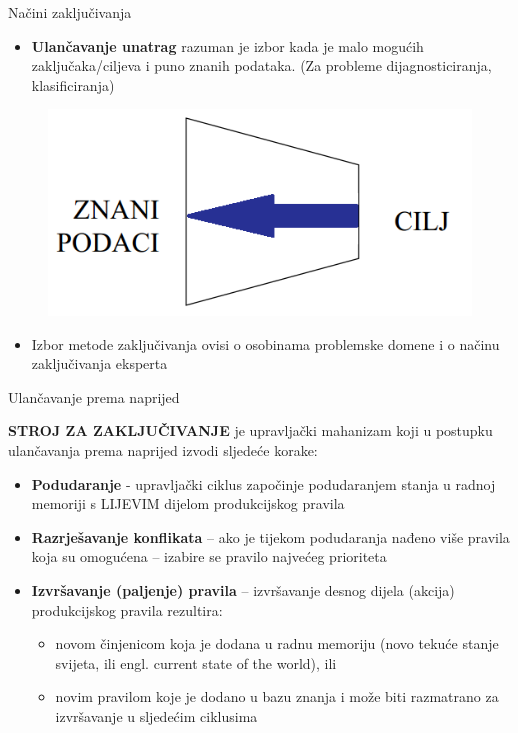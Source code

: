 \documentclass[xcolor=dvipsnames]{beamer}
\begin{document}
\begin{frame}{Načini zaključivanja}

\begin{itemize}
\item \textbf{Ulančavanje unatrag} razuman je izbor kada je malo mogućih zaključaka/ciljeva i puno znanih podataka. (Za probleme dijagnosticiranja, klasificiranja)
\end{itemize}


\begin{figure}
\center
\includegraphics[scale=0.5]{img/natrag.png}
\end{figure}


\begin{itemize}
\item Izbor metode zaključivanja ovisi o osobinama problemske domene i o načinu zaključivanja eksperta
\end{itemize}

\end{frame}

\begin{frame}{Ulančavanje prema naprijed}

\textbf{STROJ ZA ZAKLJUČIVANJE} je upravljački mahanizam koji u postupku ulančavanja prema naprijed izvodi sljedeće korake:
\begin{itemize}
\item \textbf{Podudaranje} - upravljački ciklus započinje podudaranjem stanja u radnoj memoriji s LIJEVIM dijelom produkcijskog pravila
\item \textbf{Razrješavanje konflikata} – ako je tijekom podudaranja nađeno više pravila koja su omogućena – izabire se pravilo najvećeg prioriteta
\item \textbf{Izvršavanje (paljenje) pravila} – izvršavanje desnog dijela (akcija) produkcijskog pravila rezultira:
\begin{itemize}
\item novom činjenicom koja je dodana u radnu memoriju (novo tekuće stanje svijeta, ili engl. current state of the world), ili
\item novim pravilom koje je dodano u bazu znanja i može biti razmatrano za izvršavanje u sljedećim ciklusima
\end{itemize}
\end{itemize}
\end{frame}
\end{document}
